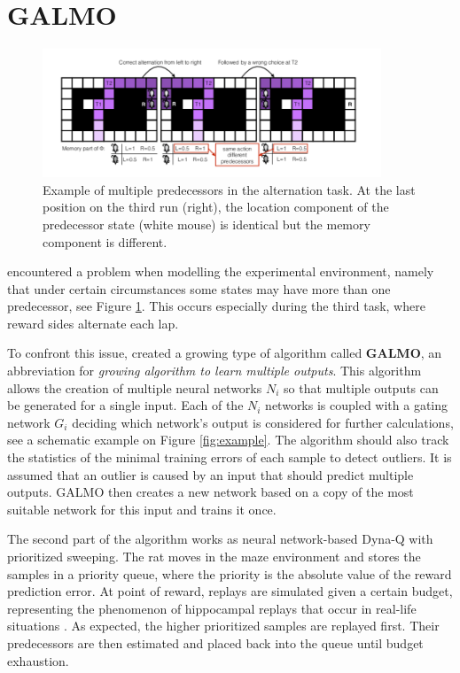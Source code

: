 \documentclass[a4paper]{article}
\begin{document}
	\section{GALMO}
	\begin{figure}[t]
		\centering
		\includegraphics[angle=0,width=0.9\textwidth]{./figs/MultiplePredecessors.png}
		\caption{\label{fig:predecessors}Example of multiple predecessors in the alternation task. At the last position on the third run (right), the location component of the predecessor state (white mouse) is identical but the memory component is different. \citep{NeuralDynaQ}}
	\end{figure}
	\label{sec:galmo}
	\citet{NeuralDynaQ} encountered a problem when modelling the experimental environment, namely that under certain circumstances some states may have more than one predecessor, see Figure \ref{fig:predecessors}. This occurs especially during the third task, where reward sides alternate each lap.
	\par To confront this issue, \citet{NeuralDynaQ} created a growing type of algorithm called \textbf{GALMO}, an abbreviation for \textit{growing algorithm to learn multiple outputs}. This algorithm allows the creation of multiple neural networks $N_i$ so that multiple outputs can be generated for a single input. Each of the $N_i$ networks is coupled with a gating network $G_i$ deciding which network's output is considered for further calculations, see a schematic example on Figure \ref{fig:example}. The algorithm should also track the statistics of the minimal training errors of each sample to detect outliers. It is assumed that an outlier is caused by an input that should predict multiple outputs. GALMO then creates a new network based on a copy of the most suitable network for this input and trains it once. 
	\par The second part of the algorithm works as neural network-based Dyna-Q with prioritized sweeping. The rat moves in the maze environment and stores the samples in a priority queue, where the priority is the absolute value of the reward prediction error. At point of reward, replays are simulated given a certain budget, representing the phenomenon of hippocampal replays that occur in real-life situations \citep{OKEEFE1971171}. As expected, the higher prioritized samples are replayed first. Their predecessors are then estimated and placed back into the queue until budget exhaustion.\\
\end{document}
